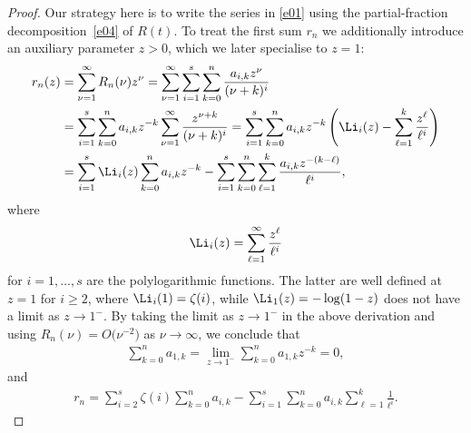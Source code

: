 \begin{proof}
Our strategy here is to write the series in \eqref{e01} using the partial-fraction decomposition~\eqref{e04} of $R(t)$. To treat the first sum $r_n$ we additionally introduce an auxiliary parameter $z>0$, which we later specialise to $z=1$:
\begin{align*}
r_n(z) &=\sum_{\nu=1}^\infty R_n(\nu)z^\nu
=\sum_{\nu=1}^\infty\sum_{i=1}^s\sum_{k=0}^n\frac{a_{i,k}z^\nu}{(\nu+k)^i}\\
&=\sum_{i=1}^s\sum_{k=0}^na_{i,k}z^{-k}\sum_{\nu=1}^\infty\frac{z^{\nu+k}}{(\nu+k)^i}
=\sum_{i=1}^s\sum_{k=0}^na_{i,k}z^{-k}\left(\Li_i(z)-\sum_{\ell=1}^k\frac{z^\ell}{\ell^i}\right)\\
&=\sum_{i=1}^s\Li_i(z)\sum_{k=0}^na_{i,k}z^{-k}-\sum_{i=1}^s\sum_{k=0}^n\sum_{\ell=1}^k\frac{a_{i,k}z^{-(k-\ell)}}{\ell^i},
\end{align*}
where
\begin{gather*}
\Li_i(z)=\sum_{\ell=1}^\infty\frac{z^\ell}{\ell^i}
\end{gather*}
for $i=1,\dots,s$ are the polylogarithmic functions. The latter are well defined at $z=1$ for $i\ge2$, where $\Li_i(1)=\zeta(i)$, while $\Li_1(z)=-\log(1-z)$ does not have a limit as $z\to1^-$. By taking the limit as $z\to1^-$ in the above derivation and using $R_n(\nu)=O\big(\nu^{-2}\big)$ as $\nu\to\infty$, we conclude that
\begin{gather*}
\sum_{k=0}^na_{1,k}=\lim_{z\to1^-}\sum_{k=0}^na_{1,k}z^{-k}=0,
\end{gather*}
and
\begin{gather}
r_n=\sum_{i=2}^s\zeta(i)\sum_{k=0}^na_{i,k}-\sum_{i=1}^s\sum_{k=0}^na_{i,k}\sum_{\ell=1}^k\frac1{\ell^i}.\label{e07}
\end{gather}


\end{proof}
